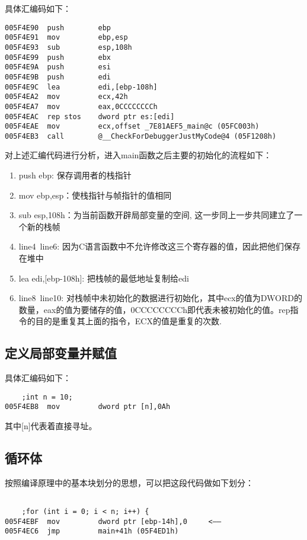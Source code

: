 具体汇编码如下：
\begin{lstlisting}
005F4E90  push        ebp  
005F4E91  mov         ebp,esp  
005F4E93  sub         esp,108h  
005F4E99  push        ebx  
005F4E9A  push        esi  
005F4E9B  push        edi  
005F4E9C  lea         edi,[ebp-108h]  
005F4EA2  mov         ecx,42h  
005F4EA7  mov         eax,0CCCCCCCCh  
005F4EAC  rep stos    dword ptr es:[edi]  
005F4EAE  mov         ecx,offset _7E81AEF5_main@c (05FC003h)  
005F4EB3  call        @__CheckForDebuggerJustMyCode@4 (05F1208h)  
\end{lstlisting}

对上述汇编代码进行分析，进入main函数之后主要的初始化的流程如下：
\begin{enumerate}
    \item push        ebp: 保存调用者的栈指针
    \item mov         ebp,esp：使栈指针与帧指针的值相同
    \item sub         esp,108h：为当前函数开辟局部变量的空间, 这一步同上一步共同建立了一个新的栈帧
    \item line4~line6: 因为C语言函数中不允许修改这三个寄存器的值，因此把他们保存在堆中
    \item lea         edi,[ebp-108h]: 把栈帧的最低地址复制给edi
    \item line8~line10: 对栈帧中未初始化的数据进行初始化，其中ecx的值为DWORD的数量，eax的值为要储存的值，0CCCCCCCCh即代表未被初始化的值。rep指令的目的是重复其上面的指令，ECX的值是重复的次数.
\end{enumerate}

\subsection{定义局部变量并赋值}

具体汇编码如下：
\begin{lstlisting}
    ;int n = 10;
005F4EB8  mov         dword ptr [n],0Ah  
\end{lstlisting}

其中[n]代表着直接寻址。

\subsection{循环体}

按照编译原理中的基本块划分的思想，可以把这段代码做如下划分：
\begin{lstlisting}

    ;for (int i = 0; i < n; i++) {
005F4EBF  mov         dword ptr [ebp-14h],0     <——
005F4EC6  jmp         main+41h (05F4ED1h)  

\end{lstlisting}

